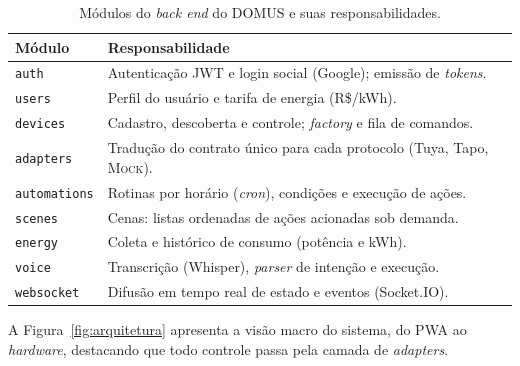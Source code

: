 \begin{table}[H]
\centering
\caption{Módulos do \emph{back end} do DOMUS e suas responsabilidades.}
\label{tab:modulos}
\begin{tabular}{@{}ll@{}}
\toprule
\textbf{Módulo} & \textbf{Responsabilidade} \\
\midrule
\texttt{auth}       & Autenticação JWT e login social (Google); emissão de \textit{tokens}. \\
\texttt{users}      & Perfil do usuário e tarifa de energia (R\$/kWh). \\
\texttt{devices}    & Cadastro, descoberta e controle; \emph{factory} e fila de comandos. \\
\texttt{adapters}   & Tradução do contrato único para cada protocolo (Tuya, Tapo, \textsc{Mock}). \\
\texttt{automations}& Rotinas por horário (\emph{cron}), condições e execução de ações. \\
\texttt{scenes}     & Cenas: listas ordenadas de ações acionadas sob demanda. \\
\texttt{energy}     & Coleta e histórico de consumo (potência e kWh). \\
\texttt{voice}      & Transcrição (Whisper), \emph{parser} de intenção e execução. \\
\texttt{websocket}  & Difusão em tempo real de estado e eventos (Socket.IO). \\
\bottomrule
\end{tabular}
\end{table}

A Figura~\ref{fig:arquitetura} apresenta a visão macro do sistema, do PWA ao
\emph{hardware}, destacando que todo controle passa pela camada de
\emph{adapters}.


